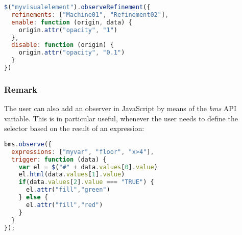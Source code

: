 \begin{lstlisting}[float=ht,language=JavaScript]
$("myvisualelement").observeRefinement({
  refinements: ["Machine01", "Refinement02"],
  enable: function (origin, data) {
    origin.attr("opacity", "1")
  },
  disable: function (origin) {
    origin.attr("opacity", "0.1")
  }
})
\end{lstlisting}

\subsubsection{Remark}

The user can also add an observer in JavaScript by means of the \textit{bms} API variable. 
This is in particular useful, whenever the user needs to define the selector based on the result of an expression:

\begin{lstlisting}[float=ht,language=JavaScript]
bms.observe({
  expressions: ["myvar", "floor", "x>4"],
  trigger: function (data) {
  	var el = $("#" + data.values[0].value)
    el.html(data.values[1].value)
    if(data.values[2].value === "TRUE") {
      el.attr("fill","green")
    } else {
      el.attr("fill","red")
    }
  }
});
\end{lstlisting}


